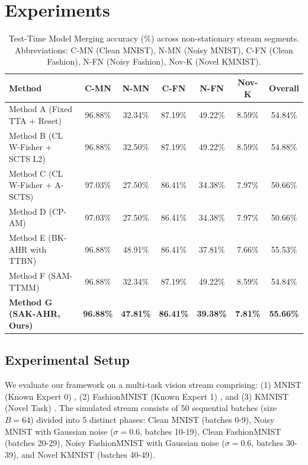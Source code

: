 \documentclass{article}
\theoremstyle{plain}
\theoremstyle{definition}
\theoremstyle{remark}
\begin{document}
\section{Experiments}
\label{sec:experiments}

\begin{table}[t]
\caption{Test-Time Model Merging accuracy (\%) across non-stationary stream segments. Abbreviations: C-MN (Clean MNIST), N-MN (Noisy MNIST), C-FN (Clean Fashion), N-FN (Noisy Fashion), Nov-K (Novel KMNIST).}
\label{tab:results}
\vskip 0.15in
\begin{center}
\begin{small}
\begin{tabular}{lcccccc}
\toprule
Method & C-MN & N-MN & C-FN & N-FN & Nov-K & Overall \\
\midrule
Method A (Fixed TTA + Reset) & 96.88\% & 32.34\% & 87.19\% & 49.22\% & 8.59\% & 54.84\% \\
Method B (CL W-Fisher + SCTS L2) & 96.88\% & 32.50\% & 87.19\% & 49.22\% & 8.59\% & 54.88\% \\
Method C (CL W-Fisher + A-SCTS) & 97.03\% & 27.50\% & 86.41\% & 34.38\% & 7.97\% & 50.66\% \\
Method D (CP-AM) & 97.03\% & 27.50\% & 86.41\% & 34.38\% & 7.97\% & 50.66\% \\
Method E (BK-AHR with TTBN) & 96.88\% & 48.91\% & 86.41\% & 37.81\% & 7.66\% & 55.53\% \\
Method F (SAM-TTMM) & 96.88\% & 32.34\% & 87.19\% & 49.22\% & 8.59\% & 54.84\% \\
\textbf{Method G (SAK-AHR, Ours)} & \textbf{96.88\%} & \textbf{47.81\%} & \textbf{86.41\%} & \textbf{39.38\%} & \textbf{7.81\%} & \textbf{55.66\%} \\
\bottomrule
\end{tabular}
\end{small}
\end{center}
\vskip -0.1in
\end{table}

\subsection{Experimental Setup}
We evaluate our framework on a multi-task vision stream comprising: (1) MNIST (Known Expert 0) \cite{lecun1998mnist}, (2) FashionMNIST (Known Expert 1) \cite{xiao2017fashion}, and (3) KMNIST (Novel Task) \cite{clanuwat2018kmnist}. The simulated stream consists of 50 sequential batches (size $B = 64$) divided into 5 distinct phases: Clean MNIST (batches 0-9), Noisy MNIST with Gaussian noise ($\sigma = 0.6$, batches 10-19), Clean FashionMNIST (batches 20-29), Noisy FashionMNIST with Gaussian noise ($\sigma = 0.6$, batches 30-39), and Novel KMNIST (batches 40-49).
\end{document}
